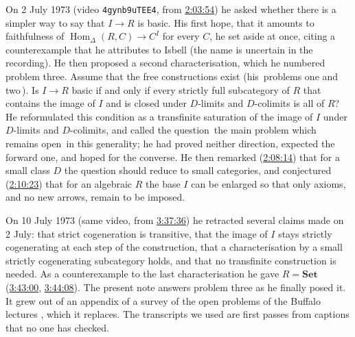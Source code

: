 \documentclass[11pt,a4paper]{amsart}
\theoremstyle{definition}
\theoremstyle{remark}
\newcommand{\q}[1]{\guillemotleft\,#1\,\guillemotright}
\newcommand{\ts}[3]{\href{https://www.youtube.com/watch?v=#1&t=#2}{#3}}
\newcommand{\Set}{\mathbf{Set}}
\newcommand{\Hom}{\operatorname{Hom}}
\begin{document}
On 2 July 1973 (video \texttt{4gynb9uTEE4}, from \ts{4gynb9uTEE4}{2h3m54s}{2:03:54}) he asked whether there is a simpler way to say that $I\to R$ is basic. His first hope, that it amounts to faithfulness of $\Hom_\Delta(R,C)\to C^I$ for every $C$, he set aside at once, citing a counterexample that he attributes to Isbell (the name is uncertain in the recording). He then proposed a second characterisation, which he numbered problem three. Assume that the free constructions exist (his \q{problems one and two}). Is $I\to R$ basic if and only if every strictly full subcategory of $R$ that contains the image of $I$ and is closed under $D$-limits and $D$-colimits is all of $R$? He reformulated this condition as a transfinite saturation of the image of $I$ under $D$-limits and $D$-colimits, and called the question \q{the main problem which remains open} in this generality; he had proved neither direction, expected the forward one, and hoped for the converse. He then remarked (\ts{4gynb9uTEE4}{2h8m14s}{2:08:14}) that for a small class $D$ the question should reduce to small categories, and conjectured (\ts{4gynb9uTEE4}{2h10m23s}{2:10:23}) that for an algebraic $R$ the base $I$ can be enlarged so that only axioms, and no new arrows, remain to be imposed.

On 10 July 1973 (same video, from \ts{4gynb9uTEE4}{3h37m36s}{3:37:36}) he retracted several claims made on 2 July: that strict cogeneration is transitive, that the image of $I$ stays strictly cogenerating at each step of the construction, that a characterisation by a small strictly cogenerating subcategory holds, and that no transfinite construction is needed. As a counterexample to the last characterisation he gave $R=\Set$ (\ts{4gynb9uTEE4}{3h43m0s}{3:43:00}, \ts{4gynb9uTEE4}{3h44m8s}{3:44:08}). The present note answers problem three as he finally posed it. It grew out of an appendix of a survey of the open problems of the Buffalo lectures \cite{open}, which it replaces. The transcripts we used are first passes from captions that no one has checked.
\end{document}
